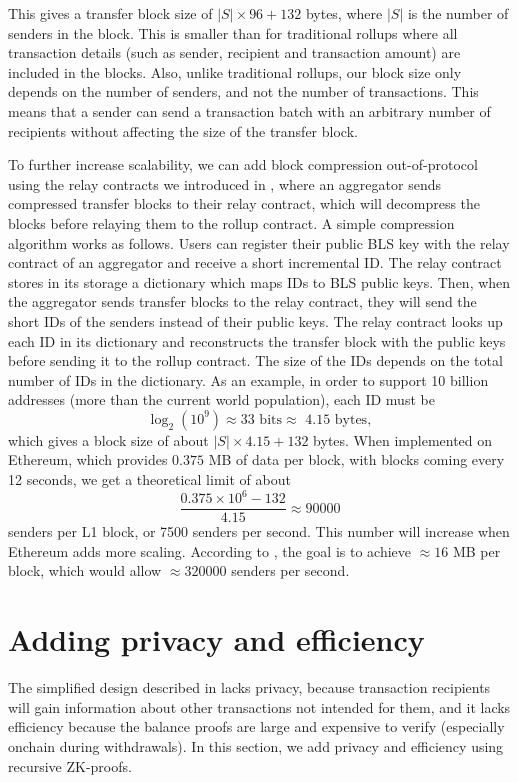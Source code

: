 This gives a transfer block size of \(|S| \times 96 + 132\) bytes, where \(|S|\) is the number of senders in the block. This is smaller than for traditional rollups where all transaction details (such as sender, recipient and transaction amount) are included in the blocks. Also, unlike traditional rollups, our block size only depends on the number of senders, and not the number of transactions. This means that a sender can send a transaction batch with an arbitrary number of recipients without affecting the size of the transfer block.

To further increase scalability, we can add block compression out-of-protocol using the relay contracts we introduced in , where an aggregator sends compressed transfer blocks to their relay contract, which will decompress the blocks before relaying them to the rollup contract. A simple compression algorithm works as follows. Users can register their public BLS key with the relay contract of an aggregator and receive a short incremental ID. The relay contract stores in its storage a dictionary which maps IDs to BLS public keys. Then, when the aggregator sends transfer blocks to the relay contract, they will send the short IDs of the senders instead of their public keys. The relay contract looks up each ID in its dictionary and reconstructs the transfer block with the public keys before sending it to the rollup contract. The size of the IDs depends on the total number of IDs in the dictionary. As an example, in order to support 10 billion addresses (more than the current world population), each ID must be \[\log_2(10^9) \approx 33 \text{ bits} \approx \text{ 4.15 bytes},\] which gives a block size of about \(|S| \times 4.15 + 132\) bytes. When implemented on Ethereum, which provides \(0.375\) MB of data per block\cite{eip4844}, with blocks coming every 12 seconds\cite{blocktime}, we get a theoretical limit of about \[\frac{0.375 \times 10^6 - 132}{4.15} \approx 90000\] senders per L1 block, or 7500 senders per second. This number will increase when Ethereum adds more scaling. According to \cite{eip4844}, the goal is to achieve \(\approx 16\) MB per block, which would allow \(\approx 320000\) senders per second.

\section{Adding privacy and efficiency}\label{section:zk}

The simplified design described in  lacks privacy, because transaction recipients will gain information about other transactions not intended for them, and it lacks efficiency because the balance proofs are large and expensive to verify (especially onchain during withdrawals). In this section, we add privacy and efficiency using recursive ZK-proofs.

